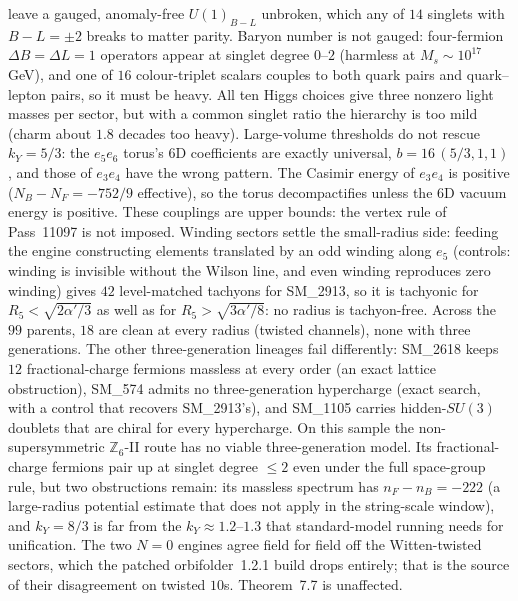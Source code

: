 \begin{boundary}
leave a gauged, anomaly-free $U(1)_{B-L}$ unbroken, which any of $14$ singlets with $B-L=\pm2$ breaks to matter parity. Baryon number is not gauged: four-fermion $\Delta B=\Delta L=1$ operators appear at singlet degree $0$--$2$ (harmless at $M_s\sim10^{17}$\,GeV), and one of $16$ colour-triplet scalars couples to both quark pairs and quark--lepton pairs, so it must be heavy. All ten Higgs choices give three nonzero light masses per sector, but with a common singlet ratio the hierarchy is too mild (charm about $1.8$ decades too heavy). Large-volume thresholds do not rescue $k_Y=5/3$: the $e_5e_6$ torus's 6D coefficients are exactly universal, $b=16\,(5/3,1,1)$, and those of $e_3e_4$ have the wrong pattern. The Casimir energy of $e_3e_4$ is positive ($N_B-N_F=-752/9$ effective), so the torus decompactifies unless the 6D vacuum energy is positive. These couplings are upper bounds: the vertex rule of Pass~11097 is not imposed.  Winding sectors settle the small-radius side: feeding the engine constructing elements translated by an odd winding along $e_5$ (controls: winding is invisible without the Wilson line, and even winding reproduces zero winding) gives $42$ level-matched tachyons for SM\_2913, so it is tachyonic for $R_5<\sqrt{2\alpha'/3}$ as well as for $R_5>\sqrt{3\alpha'/8}$: no radius is tachyon-free. Across the $99$ parents, $18$ are clean at every radius (twisted channels), none with three generations. The other three-generation lineages fail differently: SM\_2618 keeps $12$ fractional-charge fermions massless at every order (an exact lattice obstruction), SM\_574 admits no three-generation hypercharge (exact search, with a control that recovers SM\_2913's), and SM\_1105 carries hidden-$SU(3)$ doublets that are chiral for every hypercharge. On this sample the non-supersymmetric $\mathbb Z_6$-II route has no viable three-generation model.   Its fractional-charge fermions pair up at singlet degree $\le2$ even under the full space-group rule, but two obstructions remain: its massless spectrum has $n_F-n_B=-222$ (a large-radius potential estimate that does not apply in the string-scale window), and $k_Y=8/3$ is far from the $k_Y\approx1.2$--$1.3$ that standard-model running needs for unification.      The two $N=0$ engines agree field for field off the Witten-twisted sectors, which the patched orbifolder~1.2.1 build drops entirely; that is the source of their disagreement on twisted $10$s. Theorem~7.7 is unaffected.   
\end{boundary}

